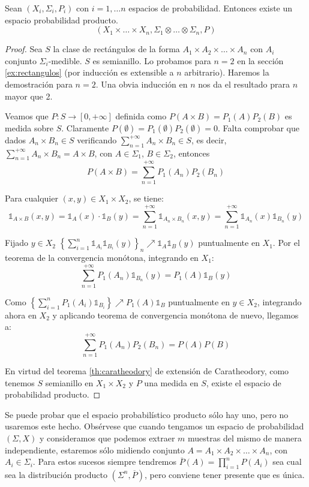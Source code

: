 \begin{theorem}
 Sean $(X_i, \Sigma_i, P_i)$ con $i=1,\ldots n$ espacios de probabilidad. Entonces existe un espacio probabilidad
 producto.
 \[(X_1 \times \ldots \times X_n, \Sigma_1 \otimes \ldots \otimes \Sigma_n, P)\]
\end{theorem}
  \begin{proof}
   Sea $S$ la clase de rectángulos de la forma $A_1 \times A_2 \times \ldots \times A_n$ con $A_i$ conjunto 
   $\Sigma_i$-medible. $S$ es semianillo. Lo probamos para $n=2$ en la sección \ref{ex:rectangulos} (por inducción es 
   extensible a $n$ arbitrario). Haremos la demostración para $n=2$. Una obvia inducción en $n$ nos da el 
   resultado prara $n$ mayor que 2.
   
   Veamos que $P:S \rightarrow [0,+\infty]$ definida como $P(A\times B) = P_1(A) P_2(B)$ es medida sobre $S$.
   Claramente $P(\emptyset) = P_1(\emptyset)P_2(\emptyset) = 0$. Falta comprobar que dados $A_n \times B_n \in S$ 
   verificando $\sum_{n=1}^{+\infty} A_n\times B_n \in S$,
   es decir, $\sum_{n=1}^{+\infty} A_n\times B_n = A\times B$, con $A \in \Sigma_1$, $B \in \Sigma_2$, entonces
   \[P(A\times B) = \sum_{n=1}^{+\infty} P_1(A_n) P_2(B_n)\]
   
   Para cualquier $(x,y) \in X_1 \times X_2$, se tiene:
   \[
     \mathds{1}_{A\times B}(x,y) = \mathds{1}_{A}(x)\cdot \mathds{1}_B(y) = \sum_{n=1}^{+\infty} 
     \mathds{1}_{A_n\times B_n}(x,y) = \sum_{n=1}^{+\infty} \mathds{1}_{A_n}(x) \mathds{1}_{B_n}(y)
   \] 
   
   Fijado $y\in X_2$ $\left\{\sum_{i=1}^{n} \mathds{1}_{A_i}\mathds{1}_{B_i}(y)\right\}_n \nearrow \mathds{1}_A \mathds{1}_B(y)$ 
   puntualmente en $X_1$. Por el teorema de la convergencia monótona, integrando en $X_1$:
   \[\sum_{n=1}^{+\infty} P_1(A_n)\mathds{1}_{B_n}(y) = P_1(A) \mathds{1}_B(y)\]
   
   Como $\left\{\sum_{i=1}^{n} P_1(A_i)\mathds{1}_{B_i}\right\} \nearrow P_1(A) \mathds{1}_B$ puntualmente en $y\in X_2$, 
   integrando ahora en $X_2$ y aplicando teorema de convergencia monótona de nuevo, llegamos a:
   \[
     \sum_{n=1}^{+\infty} P_1(A_n) P_2(B_n) = P(A) P(B)
   \]
   
   En virtud del teorema \ref{th:caratheodory} de extensión de Caratheodory, como tenemos $S$ semianillo en 
   $X_1\times X_2$ y $P$ una medida en $S$, existe el espacio de probabilidad producto.
  \end{proof}

Se puede probar que el espacio probabilístico producto sólo hay uno, pero no usaremos este hecho. Obsérvese que cuando 
tengamos un espacio de probabilidad $(\Sigma, X)$ y consideramos que podemos extraer $m$ muestras del mismo
de manera independiente, estaremos sólo midiendo conjunto $A=A_1 \times A_2 \times \ldots \times A_n$, con $A_i \in\Sigma_i$.
Para estos sucesos siempre tendremos $\overline{P}(A) = \prod_{i=1}^n P(A_i)$ sea cual sea la distribución producto
$(\Sigma^n, \overline{P})$, pero conviene tener presente que es única.

